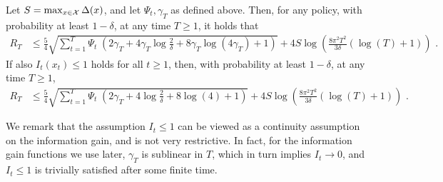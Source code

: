 \begin{theorem}\label{thm: general regret bound}
Let  $S = \max_{x \in \mathcal{X}} \Delta(x)$, and let $\Psi_t, \gamma_T$ as defined above. Then, for any policy, with probability at least $1 - \delta$, at any time $T \geq 1$,  it holds that
	\begin{align*}
		 R_T &\leq  \tfrac{5}{4}  \sqrt{\sum_{t=1}^T \Psi_t \; \left(2\gamma_T + 4 \gamma_T \log \frac{2}{\delta} + 8 \gamma_T \log(4\gamma_T) + 1\right)} + 4 S \log\left(\tfrac{8\pi^2 T^2}{3\delta} (\log(T) + 1)\right) \text{ .}
\end{align*}
	If also $I_t(x_t) \leq 1$ holds for all $t \geq 1$, then, with probability at least $1-\delta$, at any time $T \geq 1$,
	\begin{align*}
	R_T &\leq\tfrac{5}{4}  \sqrt{\sum_{t=1}^T \Psi_t \; \left(2\gamma_T + 4 \log \frac{2}{\delta} + 8 \log(4) + 1\right)} + 4 S \log\left(\tfrac{8\pi^2 T^2}{3\delta} (\log(T) + 1)\right) \text{ .}
	\end{align*}
\end{theorem}
We remark that the assumption $I_t \leq 1$ can be viewed as a continuity assumption on the information gain, and is not very restrictive. In fact, for the information gain functions we use later, $\gamma_T$ is sublinear in $T$, which in turn implies $I_t \rightarrow 0$, and $I_t \leq 1$ is trivially satisfied after some finite time.

